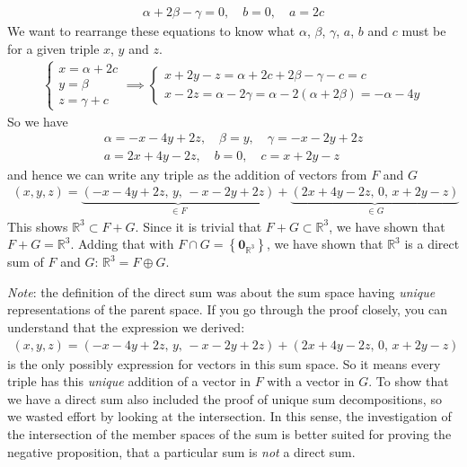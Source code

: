 {\begin{align*}
\alpha+2\beta-\gamma=0, \quad  b=0, \quad a=2c
\end{align*}
We want to rearrange these equations to know what $\alpha$, $\beta$, $\gamma$, $a$, $b$ and $c$ must be for a given triple $x$, $y$ and $z$.
\begin{align*}
\begin{cases}
x = \alpha + 2c \\
y = \beta \\
z = \gamma + c
\end{cases}
\implies
\begin{cases}
x + 2y - z =  \alpha + 2c + 2\beta - \gamma - c = c\\
x - 2z = \alpha - 2\gamma = \alpha - 2(\alpha+2\beta) = -\alpha-4y
\end{cases}
\end{align*}
So we have
\begin{align*}
\alpha = -x-4y + 2z, \quad \beta=y, \quad \gamma=-x-2y + 2z \\
a = 2x+4y-2z, \quad b=0, \quad c=x+2y-z
\end{align*}
and hence we can write any triple as the addition of vectors from $F$ and $G$
\begin{align*}
(x,y,z) = \underbrace{(-x-4y + 2z, \, y, \, -x-2y + 2z )}_{\in F} + \underbrace{(2x+4y-2z, \, 0, \, x+2y-z)}_{\in G}
\end{align*}
This shows $\mathbb{R}^3 \subset F + G$. Since it is trivial that $F+G \subset \mathbb{R}^3$, we have shown that $F+G=\mathbb{R}^3$. Adding that with $F \cap G  = \left\{ \textbf{0}_{\mathbb{R}^3} \right\}$, we have shown that $\mathbb{R}^3$ is a direct sum of $F$ and $G$: $\mathbb{R}^3=F \oplus G$.

\textit{Note}: the definition of the direct sum was about the sum space having \textit{unique} representations of the parent space. If you go through the proof closely, you can understand that the expression we derived:
\begin{align*}
(x,y,z) = (-x-4y + 2z, \, y, \, -x-2y + 2z ) + (2x+4y-2z, \, 0, \, x+2y-z)
\end{align*}
is the only possibly expression for vectors in this sum space. So it means every triple has this \textit{unique} addition of a vector in $F$ with a vector in $G$. To show that we have a direct sum also included the proof of unique sum decompositions, so we wasted effort by looking at the intersection. In this sense, the investigation of the intersection of the member spaces of the sum is better suited for proving the negative proposition, that a particular sum is \textit{not} a direct sum.
}


